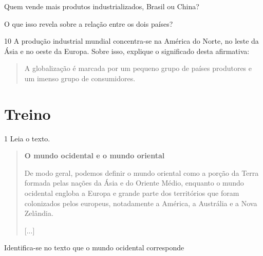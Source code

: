 \begin{escolha}
\item Quem vende mais produtos industrializados, Brasil ou China?


\item O que isso revela sobre a relação entre os dois países?

\end{escolha}

\num{10} A produção industrial mundial concentra-se na América do Norte, no leste
da Ásia e no oeste da Europa. Sobre isso, explique o significado desta afirmativa:

\begin{quote}
A globalização é marcada por um pequeno grupo de países produtores e um
imenso grupo de consumidores.
\end{quote}



\section{Treino}

\num{1} Leia o texto.

\begin{quote}
\textbf{O mundo ocidental e o mundo oriental}

De modo geral, podemos definir o mundo oriental como a porção
da Terra formada pelas nações da Ásia e do Oriente Médio, enquanto o
mundo ocidental engloba a Europa e grande parte dos territórios que
foram colonizados pelos europeus, notadamente a América, a Austrália e a
Nova Zelândia.

{[}...{]}

\end{quote}

Identifica-se no texto que o mundo ocidental corresponde

